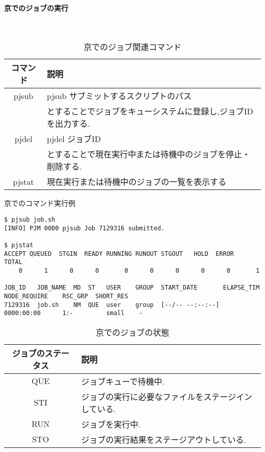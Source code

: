 \paragraph{京でのジョブの実行}~\\
\begin{table}[htb]
  \caption {京でのジョブ関連コマンド}
  \begin{center}
    \begin{tabular}{|c|p{12cm}|}
      \hline
      コマンド & 説明 \\ \hline
      pjsub & pjsub サブミットするスクリプトのパス\\
            & とすることでジョブをキューシステムに登録し,ジョブIDを出力する.\\ \hline
      pjdel & pjdel ジョブID\\
            & とすることで現在実行中または待機中のジョブを停止・削除する.\\ \hline
      pjstat & 現在実行または待機中のジョブの一覧を表示する\\ \hline
    \end{tabular}
  \end{center}
\end{table}

{\footnotesize

}

\begin{table}[htb]
  \caption {京でのコマンド実行例}
{\scriptsize
\begin{framed}
\begin{verbatim}
$ pjsub job.sh
[INFO] PJM 0000 pjsub Job 7129316 submitted.

$ pjstat
ACCEPT QUEUED  STGIN  READY RUNNING RUNOUT STGOUT   HOLD  ERROR   TOTAL
    0      1      0      0       0      0      0      0      0       1

JOB_ID   JOB_NAME  MD  ST   USER    GROUP  START_DATE       ELAPSE_TIM  NODE_REQUIRE    RSC_GRP  SHORT_RES
7129316  job.sh    NM  QUE  user    group  [--/-- --:--:--]  0000:00:00      1:-         small    -
\end{verbatim}
\end{framed}
}
\end{table}

\begin{table}[htb]
  \caption {京でのジョブの状態}
  \begin{center}
    \begin{tabular}{|c|p{12cm}|}
      \hline
      ジョブのステータス & 説明 \\ \hline
      QUE & ジョブキューで待機中.\\ \hline
      STI & ジョブの実行に必要なファイルをステージインしている.\\ \hline
      RUN & ジョブを実行中.\\ \hline
      STO & ジョブの実行結果をステージアウトしている.\\ \hline
    \end{tabular}
  \end{center}
\end{table}
